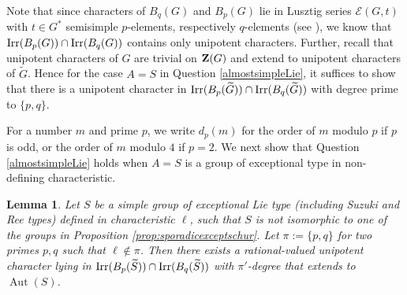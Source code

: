\documentclass[12pt,leqno,a4paper]{amsart}
\def\zent#1{{\bf Z}(#1)}
\def\irr#1{{\rm Irr}(#1)}
\newtheorem{lem}[thm]{Lemma}
\theoremstyle{remark}
\newcommand\wt[1]{\widetilde{#1}}
\newcommand{\aut}{\operatorname{Aut}}
\begin{document}
Note that since characters of $B_q(G)$ and $B_p(G)$ lie in Lusztig series $\mathcal{E}(G, t)$ with $t\in G^\ast$ semisimple $p$-elements, respectively $q$-elements (see \cite[Theorem 9.12]{CE04}), we know that $\irr{B_p(G)} \cap  \irr{B_q(G)}$ contains only unipotent characters.  Further, recall that unipotent characters of $G$ are trivial on $\zent{G}$ and extend to unipotent characters of $\wt{G}$.  Hence for the case $A=S$ in Question \ref{almostsimpleLie}, it suffices to show that there is a unipotent character in $\irr{B_p(\wt{G})} \cap  \irr{B_q(\wt{G})}$ with degree prime to $\{p,q\}$.


For a number $m$ and prime $p$, we write $d_p(m)$ for the order of $m$ modulo $p$ if $p$ is odd, or the order of $m$ modulo $4$ if $p=2$. We next show that Question \ref{almostsimpleLie} holds when $A=S$ is a group of exceptional type in non-defining characteristic.

\begin{lem}\label{lem:except}
Let $S$ be a simple group of exceptional Lie type (including Suzuki and Ree types) defined in characteristic $\ell$, such that $S$ is not isomorphic to one of the groups in Proposition \ref{prop:sporadicexceptschur}. Let $\pi:=\{p,q\}$ for two primes $p, q$ such that $\ell\not\in\pi$.
Then there exists a rational-valued unipotent character lying in $\irr{B_{p}(\wt{S})} \cap  \irr{B_{q}(\wt{S})}$ with $\pi'$-degree that extends to $\aut(S)$. 
\end{lem}
\end{document}
